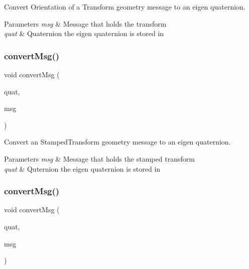 Convert Orientation of a Transform geometry message to an eigen quaternion. 


\begin{DoxyParams}{Parameters}
{\em msg} & Message that holds the transform \\
\hline
{\em quat} & Quaternion the eigen quaternion is stored in \\
\hline
\end{DoxyParams}
\mbox{\label{group__multi__robot__controller_ga34987bf2293cc8aa5fac7ac60e6510ef}} 
\subsubsection{\texorpdfstring{convert\+Msg()}{convertMsg()}\hspace{0.1cm}{\footnotesize\ttfamily [3/14]}}
{\footnotesize\ttfamily void convert\+Msg (\begin{DoxyParamCaption}\item[{Eigen\+::\+Quaterniond \&}]{quat,  }\item[{geometry\+\_\+msgs\+::\+Transform\+Stamped \&}]{msg }\end{DoxyParamCaption})\hspace{0.3cm}{\ttfamily [inline]}}



Convert an Stamped\+Transform geometry message to an eigen quaternion. 


\begin{DoxyParams}{Parameters}
{\em msg} & Message that holds the stamped transform \\
\hline
{\em quat} & Quternion the eigen quaternion is stored in \\
\hline
\end{DoxyParams}
\mbox{\label{group__multi__robot__controller_gadc07db93efb76fd809b67b74dd13b939}} 
\subsubsection{\texorpdfstring{convert\+Msg()}{convertMsg()}\hspace{0.1cm}{\footnotesize\ttfamily [4/14]}}
{\footnotesize\ttfamily void convert\+Msg (\begin{DoxyParamCaption}\item[{Eigen\+::\+Quaterniond \&}]{quat,  }\item[{geometry\+\_\+msgs\+::\+Pose \&}]{msg }\end{DoxyParamCaption})\hspace{0.3cm}{\ttfamily [inline]}}



